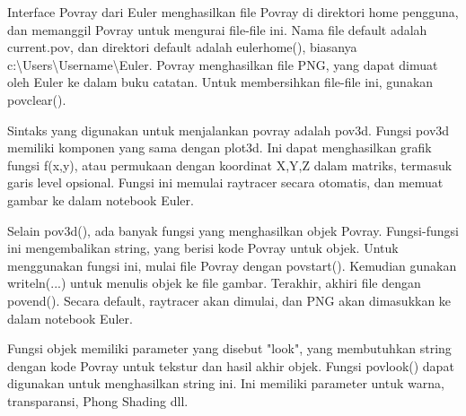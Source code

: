 \documentclass[a4paper,10pt]{article}
\begin{document}
\begin{eulernotebook}
\begin{eulercomment}
\begin{eulercomment}
\begin{eulercomment}
\begin{eulercomment}
\begin{eulercomment}
\begin{eulercomment}
\begin{eulercomment}
\begin{eulercomment}
\begin{eulercomment}
\begin{eulercomment}
\begin{eulercomment}
\begin{eulercomment}
\begin{eulercomment}
Interface Povray dari Euler menghasilkan file Povray di direktori home
pengguna, dan memanggil Povray untuk mengurai file-file ini. Nama file
default adalah current.pov, dan direktori default adalah eulerhome(),
biasanya c:\textbackslash{}Users\textbackslash{}Username\textbackslash{}Euler. Povray menghasilkan file PNG, yang
dapat dimuat oleh Euler ke dalam buku catatan. Untuk membersihkan
file-file ini, gunakan povclear().

Sintaks yang digunakan untuk menjalankan povray adalah pov3d. Fungsi
pov3d memiliki komponen yang sama dengan plot3d. Ini dapat
menghasilkan grafik fungsi f(x,y), atau permukaan dengan koordinat
X,Y,Z dalam matriks, termasuk garis level opsional. Fungsi ini memulai
raytracer secara otomatis, dan memuat gambar ke dalam notebook Euler.

Selain pov3d(), ada banyak fungsi yang menghasilkan objek Povray.
Fungsi-fungsi ini mengembalikan string, yang berisi kode Povray untuk
objek. Untuk menggunakan fungsi ini, mulai file Povray dengan
povstart(). Kemudian gunakan writeln(...) untuk menulis objek ke file
gambar. Terakhir, akhiri file dengan povend(). Secara default,
raytracer akan dimulai, dan PNG akan dimasukkan ke dalam notebook
Euler.

Fungsi objek memiliki parameter yang disebut "look", yang membutuhkan
string dengan kode Povray untuk tekstur dan hasil akhir objek. Fungsi
povlook() dapat digunakan untuk menghasilkan string ini. Ini memiliki
parameter untuk warna, transparansi, Phong Shading dll.


\end{eulercomment}
\end{eulercomment}
\end{eulercomment}
\end{eulercomment}
\end{eulercomment}
\end{eulercomment}
\end{eulercomment}
\end{eulercomment}
\end{eulercomment}
\end{eulercomment}
\end{eulercomment}
\end{eulercomment}
\end{eulercomment}
\end{eulernotebook}
\end{document}
